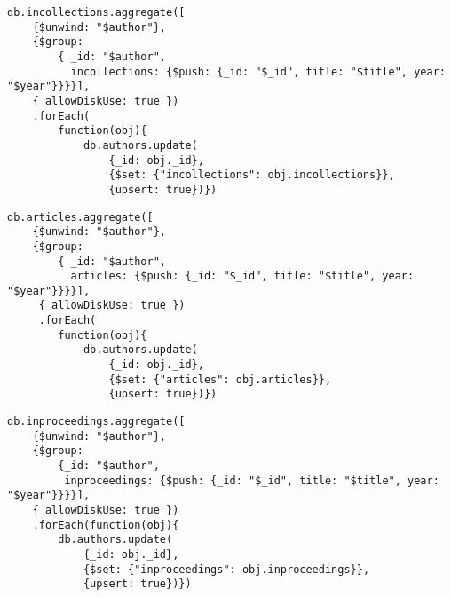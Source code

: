 \begin{verbatim}
db.incollections.aggregate([
    {$unwind: "$author"},
    {$group:
        { _id: "$author",
          incollections: {$push: {_id: "$_id", title: "$title", year: "$year"}}}}],
    { allowDiskUse: true })
    .forEach(
        function(obj){
            db.authors.update(
                {_id: obj._id},
                {$set: {"incollections": obj.incollections}},
                {upsert: true})})
\end{verbatim}

\begin{verbatim}
db.articles.aggregate([
    {$unwind: "$author"},
    {$group:
        { _id: "$author",
          articles: {$push: {_id: "$_id", title: "$title", year: "$year"}}}}],
     { allowDiskUse: true })
     .forEach(
        function(obj){
            db.authors.update(
                {_id: obj._id},
                {$set: {"articles": obj.articles}},
                {upsert: true})})
\end{verbatim}

\begin{verbatim}
db.inproceedings.aggregate([
    {$unwind: "$author"},
    {$group: 
        {_id: "$author",
         inproceedings: {$push: {_id: "$_id", title: "$title", year: "$year"}}}}],
    { allowDiskUse: true })
    .forEach(function(obj){
        db.authors.update(
            {_id: obj._id},
            {$set: {"inproceedings": obj.inproceedings}},
            {upsert: true})})
\end{verbatim}


